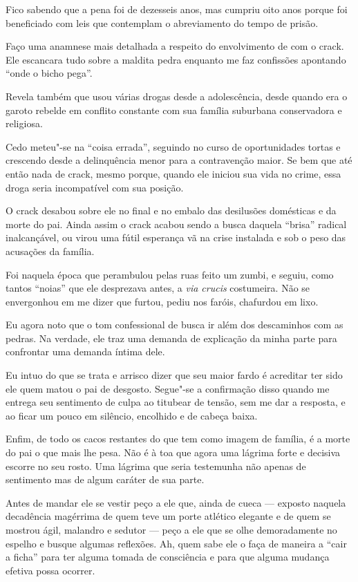 Fico sabendo que a pena foi de dezesseis anos, mas  cumpriu oito anos
porque foi beneficiado com leis que contemplam o abreviamento do tempo
de prisão.

\asterisc{}

Faço uma anamnese mais detalhada a respeito do envolvimento de  com o
crack. Ele escancara tudo sobre a maldita pedra enquanto me faz
confissões apontando ``onde o bicho pega''.

Revela também que usou várias drogas desde a adolescência, desde quando
era o garoto rebelde em conflito constante com sua família suburbana
conservadora e religiosa.

Cedo meteu"-se na ``coisa errada'', seguindo no curso de oportunidades
tortas e crescendo desde a delinquência menor para a contravenção maior.
Se bem que até então nada de crack, mesmo porque, quando ele iniciou sua
vida no crime, essa droga seria incompatível com sua posição.

O crack desabou sobre ele no final e no embalo das desilusões domésticas
e da morte do pai. Ainda assim o crack acabou sendo a busca daquela
``brisa'' radical inalcançável, ou virou uma fútil esperança vã na crise
instalada e sob o peso das acusações da família.

Foi naquela época que  perambulou pelas ruas feito um zumbi, e seguiu,
como tantos ``noias'' que ele desprezava antes, a \emph{via crucis}
costumeira. Não se envergonhou em me dizer que furtou, pediu nos faróis,
chafurdou em lixo.

Eu agora noto que o tom confessional de  busca ir além dos descaminhos
com as pedras. Na verdade, ele traz uma demanda de explicação da minha
parte para confrontar uma demanda íntima dele.

Eu intuo do que se trata e arrisco dizer que seu maior fardo é acreditar
ter sido ele quem matou o pai de desgosto. Segue"-se a confirmação disso
quando  me entrega seu sentimento de culpa ao titubear de tensão, sem
me dar a resposta, e ao ficar um pouco em silêncio, encolhido e de
cabeça baixa.

Enfim, de todo os cacos restantes do que  tem como imagem de família,
é a morte do pai o que mais lhe pesa. Não é à toa que agora uma lágrima
forte e decisiva escorre no seu rosto. Uma lágrima que seria testemunha
não apenas de sentimento mas de algum caráter de sua parte.

Antes de mandar ele se vestir peço a ele que, ainda de cueca --- exposto
naquela decadência magérrima de quem teve um porte atlético elegante e
de quem se mostrou ágil, malandro e sedutor --- peço a ele que se olhe
demoradamente no espelho e busque algumas reflexões. Ah, quem sabe ele o
faça de maneira a ``cair a ficha'' para ter alguma tomada de consciência
e para que alguma mudança efetiva possa ocorrer.

